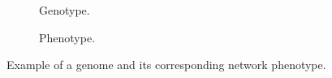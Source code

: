 \begin{figure}[htb]
    \begin{mdframed}
        \begin{subfigure}[b]{0.45\textwidth}
            \centering
            \resizebox{1\textwidth}{!}{}
            \caption{Genotype.}
            \label{genotype}
        \end{subfigure}
        \begin{subfigure}[b]{0.45\textwidth}
            \centering
            \resizebox{0.65\textwidth}{!}{}
            \caption{Phenotype.}
            \label{phenotype}
        \end{subfigure}
    \end{mdframed}
    \caption{Example of a genome and its corresponding network phenotype.}
    \label{mapping}
\end{figure}
